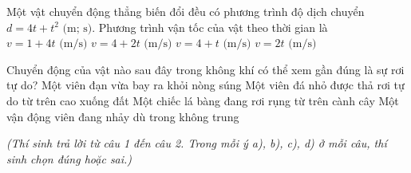 \begin{ex}
	Một vật chuyển động thẳng biến đổi đều có phương trình độ dịch chuyển $d = 4t + t^2\text{ (m; s)}$. Phương trình vận tốc của vật theo thời gian là
	\choice
	{$v = 1 + 4t\text{ (m/s)}$}
	{\True $v = 4 + 2t\text{ (m/s)}$}
	{$v = 4 + t\text{ (m/s)}$}
	{$v = 2t\text{ (m/s)}$}
\end{ex}

\begin{ex}
	Chuyển động của vật nào sau đây trong không khí có thể xem gần đúng là sự rơi tự do?
	\choice
	{Một viên đạn vừa bay ra khỏi nòng súng}
	{\True Một viên đá nhỏ được thả rơi tự do từ trên cao xuống đất}
	{Một chiếc lá bàng đang rơi rụng từ trên cành cây}
	{Một vận động viên đang nhảy dù trong không trung}
\end{ex}

\vspace{0.15cm}
\begin{flushleft}
	{\color{blue!50!green}}
	\textit{\small (Thí sinh trả lời từ câu 1 đến câu 2. Trong mỗi ý a), b), c), d) ở mỗi câu, thí sinh chọn đúng hoặc sai.)}
\end{flushleft}
\setcounter{ex}{0}
\setcounter{bt}{0}

